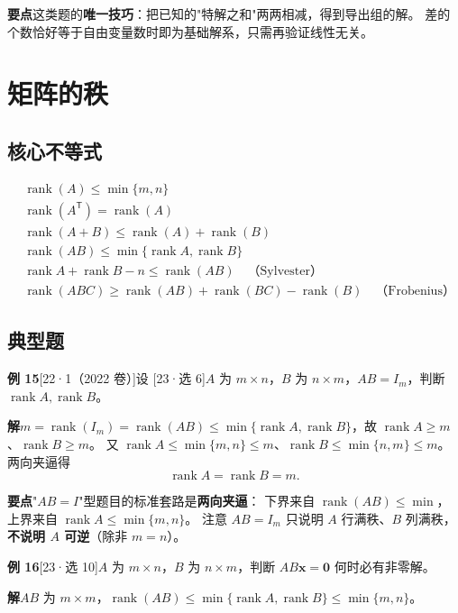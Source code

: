 \documentclass[10pt]{ctexart}
\newcommand{\rank}{\operatorname{rank}}
\newcommand{\TT}{^{\mathsf T}}
\newcommand{\yii}[1]{\textcolor{y22}{[22·#1]}}
\newcommand{\yiii}[1]{\textcolor{y23}{[23·#1]}}
\begin{document}
\begin{tipbox}
\textbf{要点}\quad 这类题的\textbf{唯一技巧}：把已知的"特解之和"两两相减，得到导出组的解。
差的个数恰好等于自由变量数时即为基础解系，只需再验证线性无关。
\end{tipbox}

\section{矩阵的秩}

\subsection{核心不等式}

\begin{align}
&\rank(A)\le\min\{m,n\}\\
&\rank(A\TT)=\rank(A)\\
&\rank(A+B)\le\rank(A)+\rank(B)\\
&\rank(AB)\le\min\{\rank A,\rank B\}\\
&\rank A+\rank B-n\le\rank(AB) \quad\text{（Sylvester）}\\
&\rank(ABC)\ge\rank(AB)+\rank(BC)-\rank(B) \quad\text{（Frobenius）}
\end{align}

\subsection{典型题}

\textbf{例 15}\yii{1（2022 卷）}\quad 设 \yiii{选 6}\quad $A$ 为 $m\times n$，$B$ 为 $n\times m$，$AB=I_m$，判断 $\rank A,\rank B$。

\textbf{解}\quad $m=\rank(I_m)=\rank(AB)\le\min\{\rank A,\rank B\}$，故 $\rank A\ge m$、$\rank B\ge m$。
又 $\rank A\le\min\{m,n\}\le m$、$\rank B\le\min\{n,m\}\le m$。两向夹逼得
\[
\rank A=\rank B=m .
\]

\begin{tipbox}
\textbf{要点}\quad "$AB=I$"型题目的标准套路是\textbf{两向夹逼}：
下界来自 $\rank(AB)\le\min$，上界来自 $\rank A\le\min\{m,n\}$。
注意 $AB=I_m$ 只说明 $A$ 行满秩、$B$ 列满秩，\textbf{不说明 $A$ 可逆}（除非 $m=n$）。
\end{tipbox}

\medskip
\textbf{例 16}\yiii{选 10}\quad $A$ 为 $m\times n$，$B$ 为 $n\times m$，判断 $AB\mathbf x=\mathbf 0$ 何时必有非零解。

\textbf{解}\quad $AB$ 为 $m\times m$，$\rank(AB)\le\min\{\rank A,\rank B\}\le\min\{m,n\}$。
\end{document}
